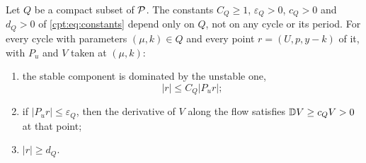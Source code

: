 \begin{lemma}\label{lem:eqseparation}
Let $Q$ be a compact subset of $\mathcal P$. The constants $C_Q\ge1$, $\varepsilon_Q>0$, $c_Q>0$ and $d_Q>0$ of \eqref{cpt:eq:constants} depend only on $Q$, not on any cycle or its period. For every cycle with parameters $(\mu,k)\in Q$ and every point $r=(U,p,y-k)$ of it, with $P_u$ and $V$ taken at $(\mu,k)$:
\begin{enumerate}[label=\textup{(\roman*)}]
\item the stable component is dominated by the unstable one,
\begin{equation}\label{eq:anglebound}
|r|\le C_Q|P_ur| ;
\end{equation}
\item if $|P_ur|\le\varepsilon_Q$, then the derivative of $V$ along the flow satisfies $\mathbb D V\ge c_QV>0$ at that point;
\item $|r|\ge d_Q$.
\end{enumerate}
\end{lemma}
